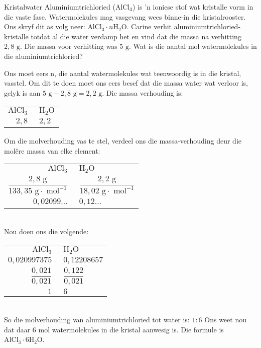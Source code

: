     \noindent
\par
            \label{m38712*eid672431}
      \noindent
      \begin{wex}{Kristalwater}{
\label{m38712*pid47982}
\label{m38712*id64827}Aluminiumtrichloried (${\text{AlCl}}_{3}$) is 'n ioniese stof wat kristalle vorm in die vaste fase. Watermolekules mag vasgevang wees binne-in die kristalrooster. Ons skryf dit as volg neer: ${\text{AlCl}}_{3} \cdot n{\text{H}}_{2}\text{O}$. Carine verhit  aluminiumtrichloried-kristalle totdat al die water verdamp het en vind dat die massa na verhitting $2,8 \text{ g}$. Die massa voor verhitting was $5 \text{ g}$. Wat is die aantal mol watermolekules in die aluminiumtrichloried?
}
{
Ons moet eers n, die aantal watermolekules wat teenwoordig is in die kristal, vasstel. Om dit te doen moet ons eers besef dat die massa water wat verloor is, gelyk is aan $5 \text{ g} - 2,8 \text{ g} = 2,2 \text{ g}$.
  \label{m38712*id3892}Die massa verhouding is:\\
\begin{tabular}{r@{:}l}
 $\text{AlCl}_3~$ & $~\text{H}_{2}\text{O}$ \\
   $2,8~$ & $~2,2$ \\
\end{tabular}
Om die molverhouding vas te stel, verdeel ons die massa-verhouding deur die mol\^{e}re massa van elke element:\\
\begin{tabular}{r@{:}l}
 $\text{AlCl}_3~$ & $~\text{H}_{2}\text{O}$ \\
    $\dfrac{2,8 \text{ g}}{133,35 \text{ g} \cdot \text{ mol}^{-1}}~$ & $~\dfrac{2,2 \text{ g}}{18,02 \text{ g} \cdot \text{ mol}^{-1}}$ \\
$0,02099...~$ & $~0,12...$  \\
\end{tabular}\\
Nou doen ons die volgende: \\
\begin{tabular}{r@{:}l}
 $\text{AlCl}_3~$ & $~\text{H}_{2}\text{O}$ \\
$0,020997375~$ & $~0,12208657$ \\
$\dfrac{0,021}{0,021}~$ & $~\dfrac{0,122}{0,021}$ \\
$1~$ & $~6$ \\
\end{tabular}\\
So die molverhouding van aluminiumtrichloried tot water is: $1:6$
Ons weet nou dat daar $6$ mol watermolekules in die kristal aanwesig is. Die formule is $\text{AlCl}_{3} \cdot 6\text{H}_{2}\text{O}$.
}
    \end{wex}
